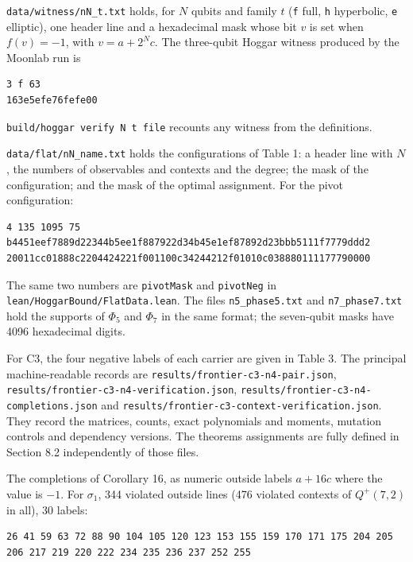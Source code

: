 \documentclass[11pt,a4paper]{article}
\begin{document}
\nolinkurl{data/witness/nN_t.txt} holds, for \(N\) qubits and family \(t\) (\texttt{f} full, \texttt{h} hyperbolic, \texttt{e} elliptic), one
header line and a hexadecimal mask whose bit \(v\) is set when \(f(v) = -1\), with \(v = a + 2^N c\). The
three-qubit Hoggar witness produced by the Moonlab run is

\begin{verbatim}
3 f 63
163e5efe76fefe00
\end{verbatim}

\texttt{build/hoggar\ verify\ N\ t\ file} recounts any witness from the definitions.

\nolinkurl{data/flat/nN_name.txt} holds the configurations of Table 1: a header line with \(N\), the numbers of
observables and contexts and the degree; the mask of the configuration; and the mask of the optimal
assignment. For the pivot configuration:

\begin{verbatim}
4 135 1095 75
b4451eef7889d22344b5ee1f887922d34b45e1ef87892d23bbb5111f7779ddd2
20011cc01888c2204424221f001100c34244212f01010c038880111177790000
\end{verbatim}

The same two numbers are \texttt{pivotMask} and \texttt{pivotNeg} in \nolinkurl{lean/HoggarBound/FlatData.lean}. The files
\texttt{n5\_phase5.txt} and \texttt{n7\_phase7.txt} hold the supports of \(\Phi_5\) and \(\Phi_7\) in the same format; the
seven-qubit masks have 4096 hexadecimal digits.

For C3, the four negative labels of each carrier are given in Table 3. The principal machine-readable
records are \nolinkurl{results/frontier-c3-n4-pair.json}, \nolinkurl{results/frontier-c3-n4-verification.json},
\nolinkurl{results/frontier-c3-n4-completions.json} and \nolinkurl{results/frontier-c3-context-verification.json}.
They record the matrices, counts, exact polynomials and moments, mutation controls and dependency
versions. The theorem\textquotesingle s assignments are fully defined in Section 8.2 independently of those files.

The completions of Corollary 16, as numeric outside labels \(a+16c\) where the value is \(-1\). For
\(\sigma_1\), 344 violated outside lines (476 violated contexts of \(Q^+(7,2)\) in all), 30 labels:

\begin{verbatim}
26 41 59 63 72 88 90 104 105 120 123 153 155 159 170 171 175 204 205 206 217 219 220 222 234 235 236 237 252 255
\end{verbatim}
\end{document}

